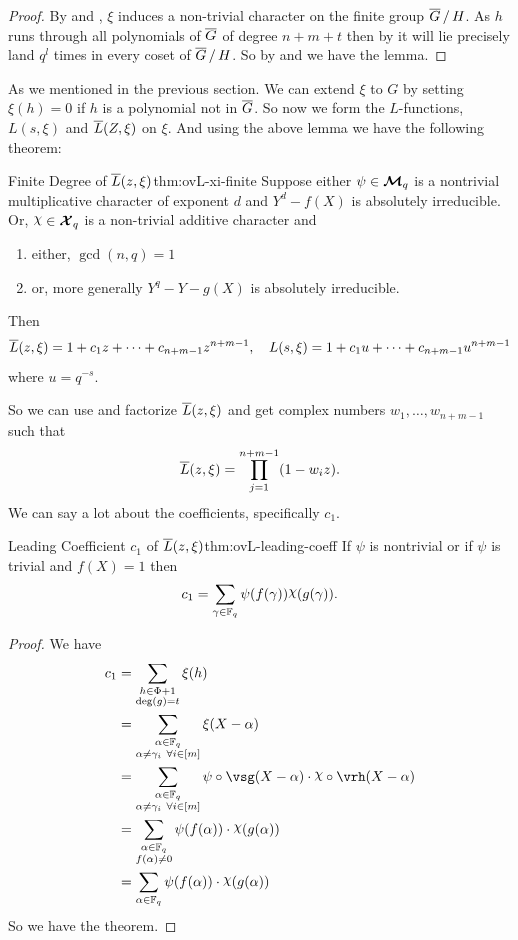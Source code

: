 \begin{proof}
  By  and , $\xi$ induces a non-trivial character on the finite group $\quotient{\ovG}{H}$. As $h$ runs through all polynomials of $\overline{G}$ of degree $n+m+t$ then by  it will lie precisely land $q^l$ times in every coset of $\quotient{\ovG}{H}$. So by \AddCharPropsthm[(i)] and \MultCharPropsthm[(i)] we have the lemma. 
\end{proof}

As we mentioned in the previous section. We can extend $\xi$ to $G$ by setting $\xi(h)=0$ if $h$ is a polynomial not in $\overline{G}$. So now we form the $L$-functions, $L(s,\xi)$ and $\overline{L}(Z,\xi)$ on $\xi$. And using the above lemma we have the following theorem:
\begin{Theorem}{Finite Degree of $\overline{L}(z,\xi)$}{thm:ovL-xi-finite}
  Suppose either $\psi\in\boldsymbol{\mathcal{M}}_q$ is a nontrivial multiplicative character of exponent $d$ and $Y^d-f(X)$ is absolutely irreducible. Or, $\chi\in\Xq$ is a non-trivial additive character and
  \begin{enumerate}[label=(\roman*)]
    \item either, $\gcd(n,q)=1$
    \item or, more generally $Y^q-Y-g(X)$ is absolutely irreducible.
  \end{enumerate}
  Then $$\overline{L}(z,\xi)=1+c_1z+\cdots+c_{n+m-1}z^{n+m-1},\quad L(s,\xi)=1+c_1u+\cdots+c_{n+m-1}u^{n+m-1}$$where $u=q^{-s}$.
\end{Theorem}

So we can use \LFactthm and factorize $\overline{L}(z,\xi)$ and get complex numbers $w_1,\dots, w_{n+m-1}$ such that $$\overline{L}(z,\xi)=\prod_{j=1}^{n+m-1}(1-w_iz).$$ We can say a lot about the coefficients, specifically $c_1$. 
\begin{Theorem}{Leading Coefficient $c_1$ of $\overline{L}(z,\xi)$}{thm:ovL-leading-coeff}
  If $\psi$ is nontrivial or if $\psi$ is trivial and $f(X)=1$ then $$c_1=\sum_{\gm\in\bbF_q}\psi(f(\gm))\chi(g(\gm)).$$
\end{Theorem}
\begin{proof}
  We have \begin{align*}
    c_1& = \sum_{\substack{h\in\Phi+1\\ \deg(g)=t}}\xi(h)\\ 
    & = \sum_{\substack{\alpha\in\bbF_q\\ \alpha\neq \gm_i\ \forall i\in[m]}}\xi(X-\alpha)\\ 
    & = \sum_{\substack{\alpha\in\bbF_q\\ \alpha\neq \gm_i\ \forall i\in[m]}}\psi\circ\vsg(X-\alpha)\cdot \chi\circ\vrh(X-\alpha)\\ 
    & = \sum_{\substack{\alpha\in\bbF_q\\ f(\alpha)\neq 0}}\psi(f(\alpha))\cdot \chi(g(\alpha))\\ 
    & = \sum_{\alpha\in\bbF_q}\psi(f(\alpha))\cdot \chi(g(\alpha))
  \end{align*}
  So we have the theorem. 
\end{proof}

